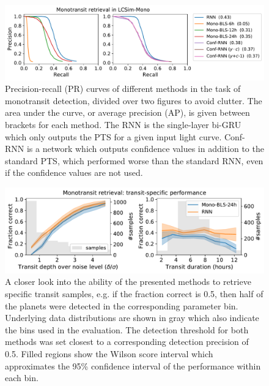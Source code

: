 \begin{figure}
    \centering
    \includegraphics[width=0.8\linewidth]{Experiments/Figures/Monos/mono_pr.pdf}
    \caption{Precision-recall (PR) curves of different methods in the task of monotransit detection, divided over two figures to avoid clutter. The area under the curve, or average precision (AP), is given between brackets for each method. The RNN is the single-layer bi-GRU which only outputs the PTS for a given input light curve. Conf-RNN is a network which outputs confidence values in addition to the standard PTS, which performed worse than the standard RNN, even if the confidence values are not used.}
    \label{fig:mono_pr}
\end{figure}

\begin{figure}
    \centering
    \includegraphics[width=0.7\linewidth]{Experiments/Figures/Monos/mono_transit_specific.pdf}
    \caption{A closer look into the ability of the presented methods to retrieve specific transit samples, e.g. if the fraction correct is 0.5, then half of the planets were detected in the corresponding parameter bin. Underlying data distributions are shown in gray which also indicate the bins used in the evaluation. The detection threshold for both methods was set closest to a corresponding detection precision of 0.5. Filled regions show the Wilson score interval \citep{wilson1927probable} which approximates the 95\% confidence interval of the performance within each bin.}
    \label{fig:mono_transits}
\end{figure}

